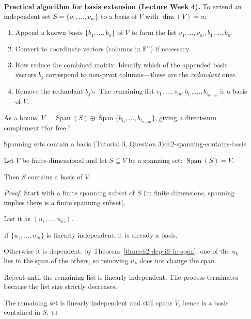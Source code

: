 \begin{policynote}
\textbf{Practical algorithm for basis extension (Lecture Week 4).}
To extend an independent set $S=\{v_1,\ldots,v_m\}$ to a basis of $V$ with $\dim(V)=n$:
\begin{enumerate}[leftmargin=*]
\item Append a known basis $\{b_1,\ldots,b_n\}$ of $V$ to form the list $v_1,\ldots,v_m,b_1,\ldots,b_n$.
\item Convert to coordinate vectors (columns in $\mathbb{F}^n$) if necessary.
\item Row reduce the combined matrix.  Identify which of the appended basis vectors $b_j$ correspond to non-pivot columns---these are the \emph{redundant} ones.
\item Remove the redundant $b_j$'s.  The remaining list $v_1,\ldots,v_m,b_{i_1},\ldots,b_{i_{n-m}}$ is a basis of $V$.
\end{enumerate}
As a bonus, $V=\operatorname{Span}(S)\oplus\operatorname{Span}\{b_{i_1},\ldots,b_{i_{n-m}}\}$, giving a direct-sum complement ``for free.''
\end{policynote}

\begin{theorem}{Spanning sets contain a basis (Tutorial 3, Question 3)}{ch2-spanning-contains-basis}

Let $V$ be finite-dimensional and let $S\subseteq V$ be a spanning set: $\operatorname{Span}(S)=V$.

Then $S$ contains a basis of $V$.

\begin{proof}

Start with a finite spanning subset of $S$ (in finite dimensions, spanning implies there is a finite spanning subset).

List it as $(u_1,\ldots,u_m)$.

If $\{u_1,\ldots,u_m\}$ is linearly independent, it is already a basis.

Otherwise it is dependent; by Theorem~\ref{thm:ch2-dep-iff-in-span}, one of the $u_k$ lies in the span of the others, so removing $u_k$ does not change the span.

Repeat until the remaining list is linearly independent. The process terminates because the list size strictly decreases.

The remaining set is linearly independent and still spans $V$, hence is a basis contained in $S$.

\end{proof}

\end{theorem}

